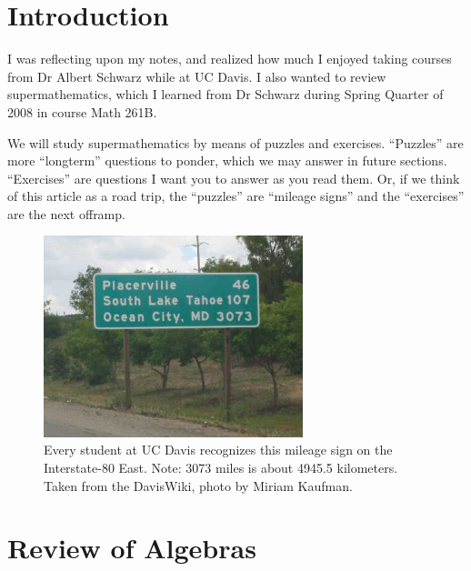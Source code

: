 \section*{Introduction}

\M I was reflecting upon my notes, and realized how much I enjoyed
taking courses from Dr Albert Schwarz while at UC Davis. I also wanted
to review supermathematics, which I learned from Dr Schwarz during
Spring Quarter of 2008 in course Math 261B.

\M
We will study supermathematics by means of puzzles and exercises.
``Puzzles'' are more ``longterm'' questions to ponder, which we may
answer in future sections. ``Exercises'' are questions I want you to
answer as you read them. Or, if we think of this article as a road
trip, the ``puzzles'' are ``mileage signs'' and the ``exercises'' are the
next offramp.

\begin{figure}[h]
  \centering
  \includegraphics[width=7.55cm]{img/ocean-city.JPG}
  \caption[Mileage sign]{Every student at UC Davis recognizes this mileage sign on the
    Interstate-80 East. Note: 3073 miles is about 4945.5 kilometers. Taken from the DavisWiki, photo by Miriam Kaufman.\footnotemark}
\end{figure}

\section{Review of Algebras}

